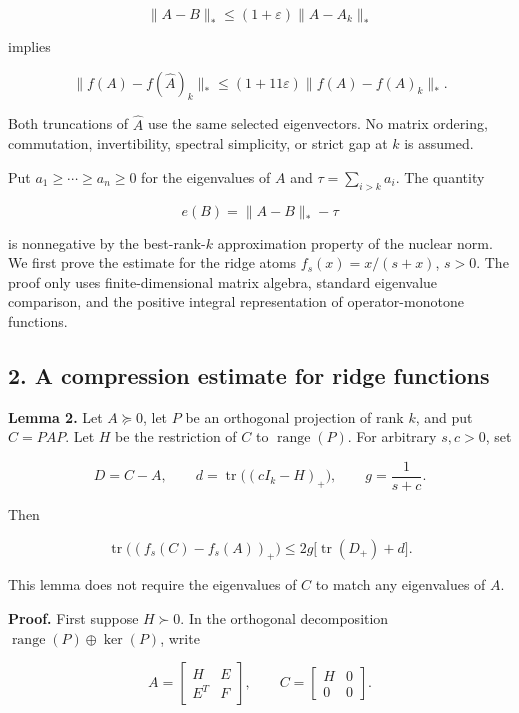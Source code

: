 \documentclass[10pt,a4paper]{article}
\begin{document}
\[
\|A-B\|_*\le(1+\varepsilon)\|A-A_k\|_*
\]

implies

\[
\|f(A)-f(\widehat A)_k\|_*
\le(1+11\varepsilon)\|f(A)-f(A)_k\|_*.
\]

Both truncations of \(\widehat A\) use the same selected eigenvectors.
No matrix ordering, commutation, invertibility, spectral simplicity, or
strict gap at \(k\) is assumed.

Put \(a_1\ge\cdots\ge a_n\ge0\) for the eigenvalues of \(A\) and
\(\tau=\sum_{i>k}a_i\). The quantity

\[
e(B)=\|A-B\|_*-\tau
\]

is nonnegative by the best-rank-\(k\) approximation property of the
nuclear norm. We first prove the estimate for the ridge atoms
\(f_s(x)=x/(s+x)\), \(s>0\). The proof only uses finite-dimensional
matrix algebra, standard eigenvalue comparison, and the positive
integral representation of operator-monotone functions.

\newpage

\subsection{2. A compression estimate for ridge
functions}\label{a-compression-estimate-for-ridge-functions}

\textbf{Lemma 2.} Let \(A\succeq0\), let \(P\) be an orthogonal
projection of rank \(k\), and put \(C=PAP\). Let \(H\) be the
restriction of \(C\) to \(\operatorname{range}(P)\). For arbitrary
\(s,c>0\), set

\[
D=C-A,\qquad
 d=\operatorname{tr}\bigl((cI_k-H)_+\bigr),\qquad
 g=\frac1{s+c}.
\]

Then

\[
\operatorname{tr}\bigl((f_s(C)-f_s(A))_+\bigr)
\le2g\bigl[\operatorname{tr}(D_+)+d\bigr].\tag{1}
\]

This lemma does not require the eigenvalues of \(C\) to match any
eigenvalues of \(A\).

\textbf{Proof.} First suppose \(H\succ0\). In the orthogonal
decomposition \(\operatorname{range}(P)\oplus\ker(P)\), write

\[
A=\begin{bmatrix}H&E\\E^T&F\end{bmatrix},
\qquad C=\begin{bmatrix}H&0\\0&0\end{bmatrix}.
\]
\end{document}
